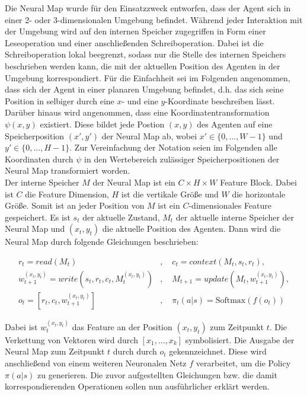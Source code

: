 Die Neural Map wurde für den Einsatzzweck entworfen, dass der Agent sich in einer 2- oder 3-dimensionalen Umgebung befindet. Während jeder Interaktion mit der Umgebung wird auf den internen Speicher zugegriffen in Form einer Leseoperation und einer anschließenden Schreiboperation. Dabei ist die Schreiboperation lokal beegrenzt, sodass nur die Stelle des internen Speichers beschrieben werden kann, die mit der aktuellen Position des Agenten in der Umgebung korrespondiert. Für die Einfachheit sei im Folgenden angenommen, dass sich der Agent in einer planaren Umgebung befindet, d.h. das sich seine Position in selbiger durch eine $x$- und eine $y$-Koordinate beschreiben lässt. Darüber hinaus wird angenommen, dass eine Koordinatentransformation $\psi(x,y)$ existiert. Diese bildet jede Postion $(x,y)$ des Agenten auf eine Speicherposition $(x',y')$ der Neural Map ab, wobei $x' \in \{0, \dots, W-1\}$ und $y' \in \{0, \dots, H-1\}$. Zur Vereinfachung der Notation seien im Folgenden alle Koordinaten durch $\psi$ in den Wertebereich zulässiger Speicherpositionen der Neural Map transformiert worden. \\

Der interne Speicher $M$ der Neural Map ist ein $C \times H \times W$ Feature Block. Dabei ist $C$ die Feature Dimension, $H$ ist die vertikale Größe und $W$ die horizontale Größe. Somit ist an jeder Position von $M$ ist ein $C$-dimensionales Feature gespeichert. Es ist $s_t$ der aktuelle Zustand, $M_t$ der aktuelle interne Speicher der Neural Map und $(x_t,y_t)$ die aktuelle Position des Agenten. Dann wird die Neural Map durch folgende Gleichungen beschrieben:

\begin{equation}
  \begin{align}
    r_t=read(M_t)&, \quad c_t=context(M_t, s_t, r_t), \\
    w_{t+1}^{(x_t,y_t)}=write(s_t, r_t, c_t, M_t^{(x_t,y_t)})&, \quad M_{t+1}=update(M_t, w_{t+1}^{(x_t,y_t)}), \\
    o_t=[r_t, c_t, w_{t+1}^{(x_t,y_t)}]&, \quad \pi_t(a|s)=\text{Softmax}(f(o_t))
  \end{align}
\end{equation}

Dabei ist $w_t^{(x_t,y_t)}$ das Feature an der Position $(x_t,y_t)$ zum Zeitpunkt $t$. Die Verkettung von Vektoren wird durch $[x_1, \dots, x_k]$ symbolisiert. Die Ausgabe der Neural Map zum Zeitpunkt $t$ durch durch $o_t$ gekennzeichnet. Diese wird anschließend von einem weiteren Neuronalen Netz $f$ verarbeitet, um die Policy $\pi(a|s)$ zu generieren. Die zuvor aufgestellten Gleichungen bzw. die damit korrespondierenden Operationen sollen nun ausführlicher erklärt werden.

